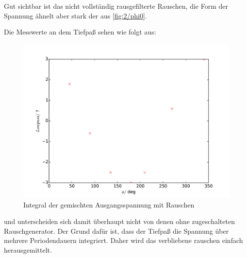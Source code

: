 Gut sichtbar ist das nicht vollständig rausgefilterte Rauschen, die Form der
Spannung ähnelt aber stark der aus \ref{fig:2/phi0}.

Die Messwerte an dem Tiefpaß sehen wie folgt aus:

\begin{figure}
  \centering
  \includegraphics{plot3low.pdf}
  \caption{Integral der gemischten Ausgangsspannung mit Rauschen}
  \label{fig:plot3low}
\end{figure}

und unterscheiden sich damit überhaupt nicht von denen ohne zugeschalteten
Rauschgenerator. Der Grund dafür ist, dass der Tiefpaß die Spannung über mehrere
Periodendauern integriert. Daher wird das verbliebene rauschen einfach
herausgemittelt.

